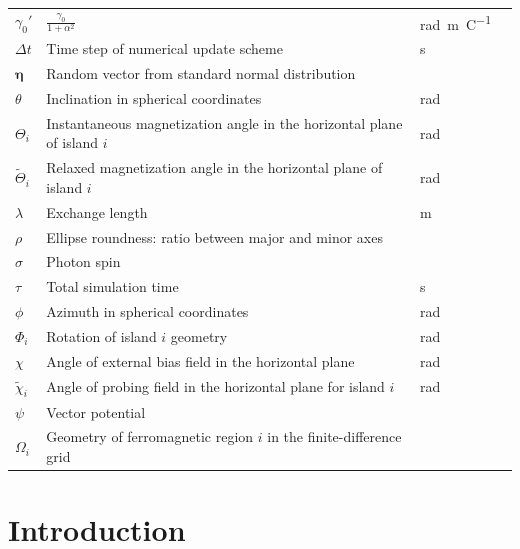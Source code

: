 \documentclass[11pt,a4paper,english,twoside]{article}
\renewcommand{\vec}[1]{\boldsymbol{#1}}
\begin{document}
\begin{longtable}{llll}
$\gamma_0'$ & $\frac{\gamma_0}{1+\alpha^2}$ & \si{\radian\metre\per\coulomb} \\
$\Delta t$ & Time step of numerical update scheme & \si{\second} \\
$\vec{\eta}$ & Random vector from standard normal distribution &  \\
$\theta$ & Inclination in spherical coordinates & \si{\radian} \\
$\Theta_i$ & Instantaneous magnetization angle in the horizontal plane of island $i$ & \si{\radian} \\
$\widetilde{\Theta}_i$ & Relaxed magnetization angle in the horizontal plane of island $i$ & \si{\radian} \\
$\lambda$ & Exchange length & \si{\metre} \\
$\rho$ & Ellipse roundness: ratio between major and minor axes &  \\
$\sigma$ & Photon spin & \si{} \\
$\tau$ & Total simulation time & \si{\second} \\
$\phi$ & Azimuth in spherical coordinates & \si{\radian} \\
$\Phi_i$ & Rotation of island $i$ geometry & \si{\radian} \\
$\chi$ & Angle of external bias field in the horizontal plane & \si{\radian} \\
$\widetilde{\chi}_i$ & Angle of probing field in the horizontal plane for island $i$ & \si{\radian} \\
$\psi$ & Vector potential & \\
$\Omega_i$ & Geometry of ferromagnetic region $i$ in the finite-difference grid & \\
\bottomrule
\end{longtable}



\cleardoublepage
{}
\section{Introduction}
\end{document}
